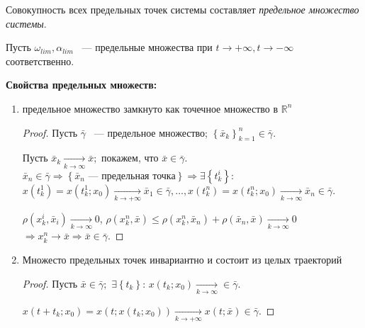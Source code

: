 \begin{definition}
    Совокупность всех предельных точек системы составляет \textit{предельное множество системы}.
\end{definition}

Пусть \( \omega_{lim}, \alpha_{lim} \) ~--- предельные множества при \( t \rightarrow +\infty, t \rightarrow -\infty \) соответственно.

\textbf{Свойства предельных множеств:}
\begin{enumerate}
\item предельное множество замкнуто как точечное множество в \( \mathbb{R}^n \)
    \begin{proof}
        Пусть \( \bar{\gamma} \) ~--- предельное множество; \( \left\lbrace \bar{x}_k \right\rbrace_{k=1}^n \in \bar{\gamma}. \)
    
        Пусть \( \bar{x}_k \xrightarrow[k \rightarrow \infty]{} \bar{x}; \) покажем, что \( \bar{x} \in \bar{\gamma} \).
        \( \bar{x}_n \in \bar{\gamma} \Rightarrow \left\lbrace \bar{x}_n \text{~--- предельная точка} \right\rbrace \Rightarrow \exists \left\lbrace t_k^i \right\rbrace \): \( x(t_k^1) = x(t_k^1; x_0) \xrightarrow[k \rightarrow +\infty]{} \bar{x}_1 \in \bar{\gamma}, \ldots, x(t_k^n) = x(t_k^n; x_0) \xrightarrow[k \rightarrow \infty]{} \bar{x}_n \in \bar{\gamma}. \)
    
       \( \rho(x_k^i, \bar{x}_i) \xrightarrow[k \rightarrow \infty]{} 0 \), \( \rho(x_k^n, \bar{x}) \leqslant \rho(x_k^n, \bar{x}_n) + \rho(\bar{x}_n, \bar{x}) \xrightarrow[k \rightarrow \infty]{} 0 \) \( \Rightarrow x_k^n \rightarrow \bar{x} \Rightarrow \bar{x} \in \bar{\gamma}. \)
    \end{proof}

\item Множесто предельных точек инвариантно и состоит из целых траекторий
    \begin{proof}
        Пусть \( \bar{x} \in \bar{\gamma}; \) \( \exists \left\lbrace t_k \right\rbrace \): \( x(t_k; x_0) \xrightarrow[k \rightarrow \infty]{} \in \bar{\gamma}. \)
        
        \( x(t + t_k; x_0) = x(t; x(t_k; x_0)) \xrightarrow[k \rightarrow +\infty]{} x(t; \bar{x}) \in \bar{\gamma}. \)
    \end{proof}


\end{enumerate}
